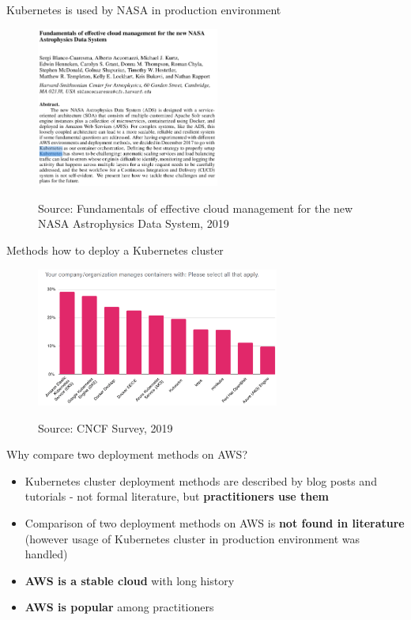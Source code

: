 \documentclass{beamer}
\newcommand{\source}[1]{\caption*{Source: {#1}} }
\begin{document}
\begin{frame}{Kubernetes is used by NASA in production environment}%
	\begin{figure}
		\includegraphics[width=6cm]{figures/k8s-used-by-nasa.png}
		\label{fig:k8s-used-by-nasa}
		\source{Fundamentals of effective cloud management for the new NASA Astrophysics Data System, 2019}
	\end{figure}
\end{frame}

\begin{frame}{Methods how to deploy a Kubernetes cluster}%
\begin{figure}
\includegraphics[width=8cm]{figures/cncf-k8s-deployment-methods.png}
\label{fig:cncf-k8s-deployment-methods}
\source{CNCF Survey, 2019}
\end{figure}
\end{frame}

\begin{frame}{Why compare two deployment methods on AWS?}%
	\begin{itemize}
		\item Kubernetes cluster deployment methods are described by blog posts and tutorials - not formal literature, but \textbf{practitioners use them}
		\item Comparison of two deployment methods on AWS is \textbf{not found in literature} (however usage of Kubernetes cluster in production environment was handled)
		\item \textbf{AWS is a stable cloud} with long history
		\item \textbf{AWS is popular} among practitioners
	\end{itemize}
\end{frame}
\end{document}
